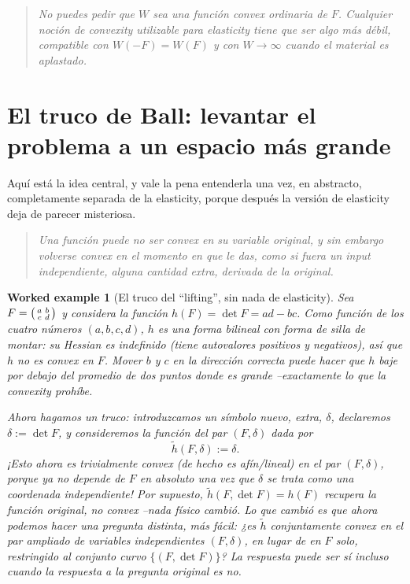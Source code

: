 \documentclass[11pt,a4paper]{article}
\newtheorem{worked}{Worked example}
\newenvironment{takeaway}
 {\begin{quote}\small\itshape\color{blue!60!black}}
 {\end{quote}}
\begin{document}
\begin{takeaway}
No puedes pedir que $W$ sea una funci\'on \emph{convex} ordinaria de
$F$. Cualquier noci\'on de \emph{convexity} utilizable para elasticity
tiene que ser algo m\'as d\'ebil, compatible con $W(-F)=W(F)$ y con
$W\to\infty$ cuando el material es aplastado.
\end{takeaway}

\section{El truco de Ball: levantar el problema a un espacio m\'as grande}
\label{sec:lifting-trick}

Aqu\'i est\'a la idea central, y vale la pena entenderla una vez, en
abstracto, completamente separada de la elasticity, porque despu\'es la
versi\'on de elasticity deja de parecer misteriosa.

\begin{takeaway}
Una funci\'on puede no ser \emph{convex} en su variable
\emph{original}, y sin embargo volverse \emph{convex} en el momento en
que le das, como si fuera un input independiente, alguna cantidad
\emph{extra, derivada} de la original.
\end{takeaway}

\begin{worked}[El truco del ``lifting'', sin nada de elasticity]
\label{ex:lifting}
Sea $F=\begin{psmallmatrix}a&b\\c&d\end{psmallmatrix}$ y considera la
funci\'on $h(F)=\det F=ad-bc$. Como funci\'on de los cuatro n\'umeros
$(a,b,c,d)$, $h$ es una forma bilineal con forma de silla de montar: su
Hessian es indefinido (tiene autovalores positivos y negativos), as\'i
que $h$ \emph{no} es \emph{convex} en $F$. Mover $b$ y $c$ en la
direcci\'on correcta puede hacer que $h$ baje por debajo del promedio de
dos puntos donde es grande --exactamente lo que la \emph{convexity}
proh\'ibe.

Ahora hagamos un truco: introduzcamos un s\'imbolo nuevo, extra,
$\delta$, declaremos $\delta:=\det F$, y consideremos la funci\'on del
\emph{par} $(F,\delta)$ dada por
\[
 \tilde h(F,\delta) := \delta.
\]
¡Esto ahora es trivialmente \emph{convex} (de hecho es af\'in/lineal) en
el par $(F,\delta)$, porque ya no depende de $F$ en absoluto una vez
que $\delta$ se trata como una coordenada independiente! Por supuesto,
$\tilde h(F,\det F) = h(F)$ recupera la funci\'on original, no
\emph{convex} --nada f\'isico cambi\'o. Lo que cambi\'o es que ahora
podemos hacer una pregunta \emph{distinta, m\'as f\'acil}: ¿es $\tilde
h$ conjuntamente \emph{convex} en el par ampliado de variables
independientes $(F,\delta)$, en lugar de en $F$ solo, restringido al
conjunto curvo $\{(F,\det F)\}$? La respuesta puede ser s\'i incluso
cuando la respuesta a la pregunta original es no.
\end{worked}
\end{document}
